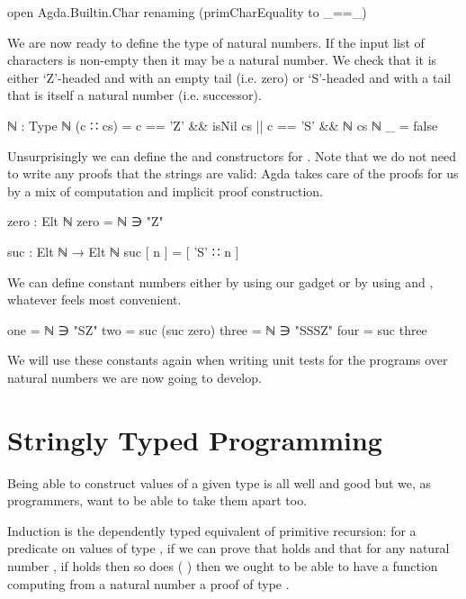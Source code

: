\documentclass[twocolumn]{article}
\begin{document}
\begin{code}
open Agda.Builtin.Char
  renaming (primCharEquality to _==_)
\end{code}

We are now ready to define the type of natural numbers. If the input
list of characters is non-empty then it may be a natural number. We
check that it is
either `Z'-headed and with an empty tail (i.e. zero)
or `S'-headed and with a tail that is itself a natural number (i.e. successor).

\begin{code}
ℕ : Type
ℕ (c ∷ cs)  =   c == 'Z' && isNil cs
            ||  c == 'S' && ℕ cs
ℕ _ = false
\end{code}

Unsurprisingly we can define the  and  constructors
for . Note that we do not need to write any proofs that the
strings are valid: Agda takes care of the proofs for us by a mix of
computation and implicit proof construction.

\begin{code}
zero : Elt ℕ
zero = ℕ ∋ "Z"

suc : Elt ℕ → Elt ℕ
suc [ n ] = [ 'S' ∷ n ]
\end{code}

We can define constant numbers either by using our  gadget or by
using  and , whatever feels most convenient.

\label{sec:natconstant}
\begin{code}
one    = ℕ ∋ "SZ"
two    = suc (suc zero)
three  = ℕ ∋ "SSSZ"
four   = suc three
\end{code}

We will use these constants again when writing unit tests for the programs
over natural numbers we are now going to develop.

\section{Stringly Typed Programming}

Being able to construct values of a given type is all well and good but
we, as programmers, want to be able to take them apart too.

Induction is the dependently typed equivalent of primitive recursion:
for a predicate  on values of type ,
if we can prove that { } holds
and that for any natural number , if { } holds
then so does { ( )}
then we ought to be able to have a function computing from a natural
number  a proof of type { }.
\end{document}
